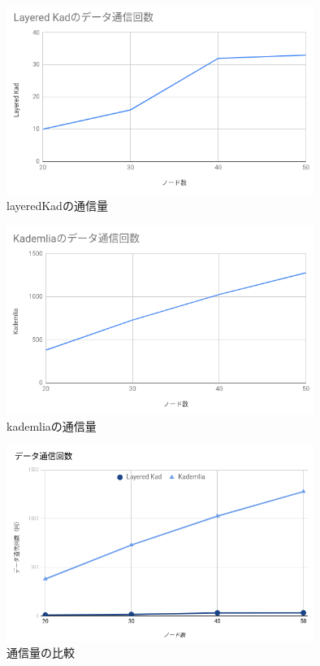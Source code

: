 \documentclass[sotsuron]{jcsie}
\begin{document}
\begin{figure}[H]
	\centering
	\includegraphics[width=10cm]{./assets/image/layered-kad_traffic.png}
	\caption{layeredKadの通信量}	
\end{figure}

\begin{figure}[H]
	\centering
	\includegraphics[width=10cm]{./assets/image/kad_traffic.png}
	\caption{kademliaの通信量}	
\end{figure}

\begin{figure}[H]
	\centering
	\includegraphics[width=10cm]{./assets/image/traffic_graph.png}
	\caption{通信量の比較}
	\label{fig:traffic-graph}
\end{figure}
\end{document}
